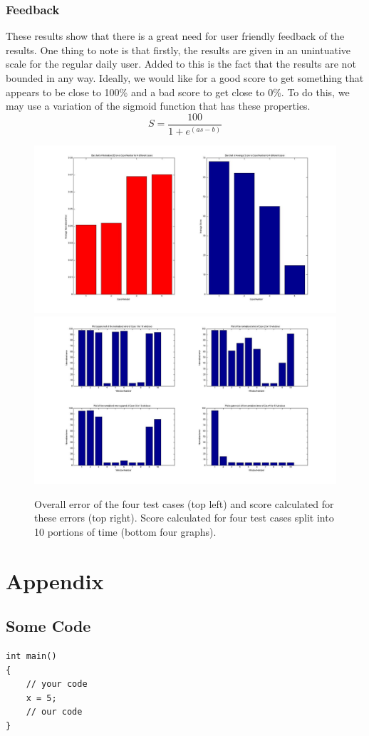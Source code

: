 \documentclass[a4paper]{article}
\begin{document}
\subsubsection{Feedback}
\noindent
These results show that there is a great need for user friendly feedback of the results. One thing to note is that firstly, the results are given in an unintuative scale for the regular daily user. Added to this is the fact that the results are not bounded in any way. Ideally, we would like for a good score to get something that appears to be close to 100\% and a bad score to get close to 0\%. To do this, we may use a variation of the sigmoid function that has these properties.
\begin{equation}
S = \frac{100}{1+e^{\left(as-b\right)}}
\end{equation}

\begin{figure}[H]
\centering
\includegraphics[scale=0.2]{Data_Analysis_Average_Score.jpg}
\includegraphics[scale=0.2]{Data_Analysis_Window_Score.jpg}

\caption{Overall error of the four test cases (top left) and score calculated for these errors (top right). Score calculated for four test cases split into 10 portions of time (bottom four graphs).}
\label{error_score}
\end{figure}


\clearpage
\section*{Appendix}
\subsection*{Some Code}
\begin{lstlisting}
int main()
{
	// your code
	x = 5;
	// our code
}

\end{lstlisting}
\end{document}
